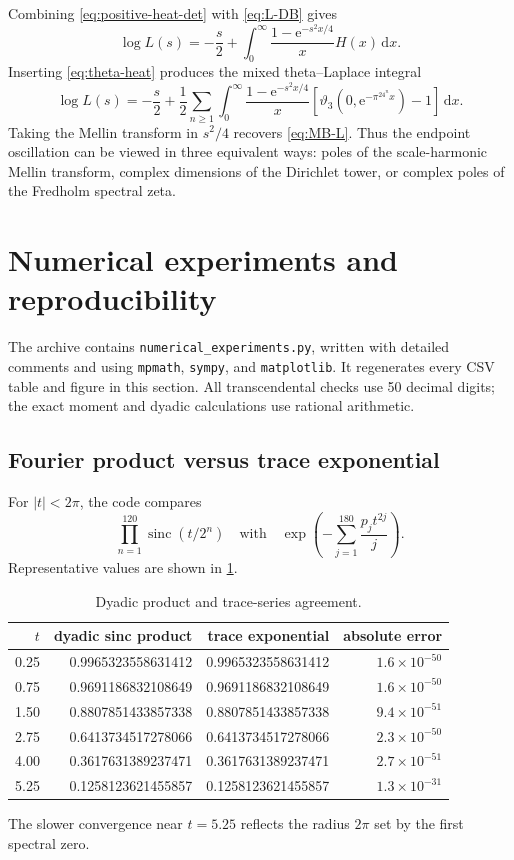 \documentclass[11pt,oneside]{article}
\theoremstyle{definition}
\newcommand{\dd}{\,\mathrm d}
\newcommand{\e}{\mathrm e}
\newcommand{\sinc}{\operatorname{sinc}}
\begin{document}
Combining \eqref{eq:positive-heat-det} with \eqref{eq:L-DB} gives
\begin{equation}
 \log L(s)=-\frac s2+
 \int_0^\infty\frac{1-\e^{-s^2x/4}}xH(x)\dd x.
 \label{eq:L-heat}
\end{equation}
Inserting \eqref{eq:theta-heat} produces the mixed theta--Laplace integral
\begin{equation}
 \log L(s)=-\frac s2+\frac12\sum_{n\ge1}\int_0^\infty
 \frac{1-\e^{-s^2x/4}}x
 \left[\vartheta_3(0,\e^{-\pi^24^nx})-1\right]\dd x.
 \label{eq:L-theta-integral}
\end{equation}
Taking the Mellin transform in \(s^2/4\) recovers \eqref{eq:MB-L}.  Thus the endpoint
oscillation can be viewed in three equivalent ways: poles of the scale-harmonic Mellin
transform, complex dimensions of the Dirichlet tower, or complex poles of the
Fredholm spectral zeta.

\section{Numerical experiments and reproducibility}
\label{sec:numerics}

The archive contains \texttt{numerical\_experiments.py}, written with detailed
comments and using \texttt{mpmath}, \texttt{sympy}, and \texttt{matplotlib}.  It
regenerates every CSV table and figure in this section.  All transcendental checks use
50 decimal digits; the exact moment and dyadic calculations use rational arithmetic.

\subsection{Fourier product versus trace exponential}

For \(|t|<2\pi\), the code compares
\[
 \prod_{n=1}^{120}\sinc(t/2^n)
 \quad\text{with}\quad
 \exp\!\left(-\sum_{j=1}^{180}\frac{p_jt^{2j}}j\right).
\]
Representative values are shown in \cref{tab:product-check}.

\begin{table}[H]
\centering
\caption{Dyadic product and trace-series agreement.}
\label{tab:product-check}
\begin{tabular}{rrrr}
\toprule
\(t\)&dyadic sinc product&trace exponential&absolute error\\
\midrule
0.25&0.9965323558631412&0.9965323558631412&\(1.6\times10^{-50}\)\\
0.75&0.9691186832108649&0.9691186832108649&\(1.6\times10^{-50}\)\\
1.50&0.8807851433857338&0.8807851433857338&\(9.4\times10^{-51}\)\\
2.75&0.6413734517278066&0.6413734517278066&\(2.3\times10^{-50}\)\\
4.00&0.3617631389237471&0.3617631389237471&\(2.7\times10^{-51}\)\\
5.25&0.1258123621455857&0.1258123621455857&\(1.3\times10^{-31}\)\\
\bottomrule
\end{tabular}
\end{table}
The slower convergence near \(t=5.25\) reflects the radius \(2\pi\) set by the first
spectral zero.
\end{document}

